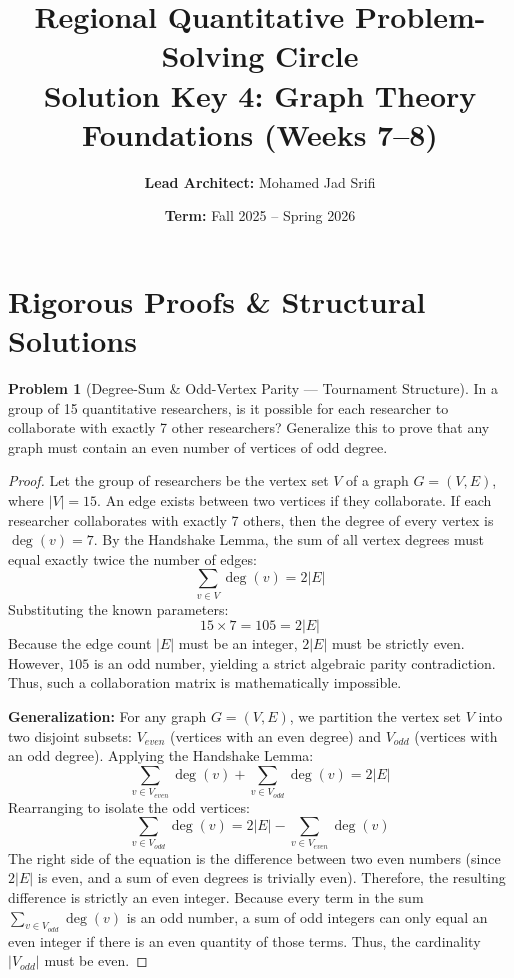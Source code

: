 \documentclass[11pt, a4paper]{article}
\theoremstyle{definition}
\newtheorem{problem}{Problem}
\theoremstyle{plain}
\begin{document}
\title{\vspace{-1.5cm}\textbf{Regional Quantitative Problem-Solving Circle} \\ \Large Solution Key 4: Graph Theory Foundations (Weeks 7--8)}
\author{\textbf{Lead Architect:} Mohamed Jad Srifi}
\date{\textbf{Term:} Fall 2025 -- Spring 2026}
\maketitle

\section*{Rigorous Proofs \& Structural Solutions}

\begin{problem}[Degree-Sum \& Odd-Vertex Parity --- Tournament Structure]
In a group of 15 quantitative researchers, is it possible for each researcher to collaborate with exactly 7 other researchers? Generalize this to prove that any graph must contain an even number of vertices of odd degree.
\end{problem}

\begin{proof}
Let the group of researchers be the vertex set $V$ of a graph $G = (V, E)$, where $|V| = 15$. An edge exists between two vertices if they collaborate.
If each researcher collaborates with exactly 7 others, then the degree of every vertex is $\deg(v) = 7$.
By the Handshake Lemma, the sum of all vertex degrees must equal exactly twice the number of edges: 
\[
\sum_{v \in V} \deg(v) = 2|E|
\]
Substituting the known parameters:
\[
15 \times 7 = 105 = 2|E|
\]
Because the edge count $|E|$ must be an integer, $2|E|$ must be strictly even. However, $105$ is an odd number, yielding a strict algebraic parity contradiction. Thus, such a collaboration matrix is mathematically impossible.

\textbf{Generalization:} For any graph $G = (V, E)$, we partition the vertex set $V$ into two disjoint subsets: $V_{even}$ (vertices with an even degree) and $V_{odd}$ (vertices with an odd degree).
Applying the Handshake Lemma:
\[
\sum_{v \in V_{even}} \deg(v) + \sum_{v \in V_{odd}} \deg(v) = 2|E|
\]
Rearranging to isolate the odd vertices:
\[
\sum_{v \in V_{odd}} \deg(v) = 2|E| - \sum_{v \in V_{even}} \deg(v)
\]
The right side of the equation is the difference between two even numbers (since $2|E|$ is even, and a sum of even degrees is trivially even). Therefore, the resulting difference is strictly an even integer. 
Because every term in the sum $\sum_{v \in V_{odd}} \deg(v)$ is an odd number, a sum of odd integers can only equal an even integer if there is an even quantity of those terms. Thus, the cardinality $|V_{odd}|$ must be even.
\end{proof}
\end{document}
